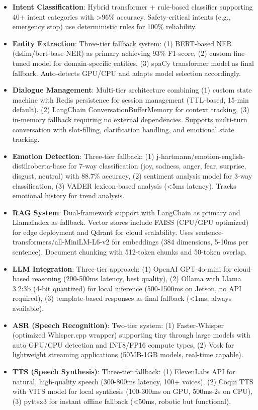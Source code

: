 \documentclass[conference]{IEEEtran}
\begin{document}
\begin{itemize}
    \item \textbf{Intent Classification}: Hybrid transformer + rule-based classifier supporting 40+ intent categories with >96\% accuracy. Safety-critical intents (e.g., emergency stop) use deterministic rules for 100\% reliability.
    
    \item \textbf{Entity Extraction}: Three-tier fallback system: (1) BERT-based NER (dslim/bert-base-NER) as primary achieving 93\% F1-score, (2) custom fine-tuned model for domain-specific entities, (3) spaCy transformer model as final fallback. Auto-detects GPU/CPU and adapts model selection accordingly.
    
    \item \textbf{Dialogue Management}: Multi-tier architecture combining (1) custom state machine with Redis persistence for session management (TTL-based, 15-min default), (2) LangChain ConversationBufferMemory for context tracking, (3) in-memory fallback requiring no external dependencies. Supports multi-turn conversation with slot-filling, clarification handling, and emotional state tracking.
    
    \item \textbf{Emotion Detection}: Three-tier fallback: (1) j-hartmann/emotion-english-distilroberta-base for 7-way classification (joy, sadness, anger, fear, surprise, disgust, neutral) with 88.7\% accuracy, (2) sentiment analysis model for 3-way classification, (3) VADER lexicon-based analysis (<5ms latency). Tracks emotional history for trend analysis.
    
    \item \textbf{RAG System}: Dual-framework support with LangChain as primary and LlamaIndex as fallback. Vector stores include FAISS (CPU/GPU optimized) for edge deployment and Qdrant for cloud scalability. Uses sentence-transformers/all-MiniLM-L6-v2 for embeddings (384 dimensions, 5-10ms per sentence). Document chunking with 512-token chunks and 50-token overlap.
    
    \item \textbf{LLM Integration}: Three-tier approach: (1) OpenAI GPT-4o-mini for cloud-based reasoning (200-500ms latency, best quality), (2) Ollama with Llama 3.2:3b (4-bit quantized) for local inference (500-1500ms on Jetson, no API required), (3) template-based responses as final fallback (<1ms, always available).
    
    \item \textbf{ASR (Speech Recognition)}: Two-tier system: (1) Faster-Whisper (optimized Whisper.cpp wrapper) supporting tiny through large models with auto GPU/CPU detection and INT8/FP16 compute types, (2) Vosk for lightweight streaming applications (50MB-1GB models, real-time capable).
    
    \item \textbf{TTS (Speech Synthesis)}: Three-tier fallback: (1) ElevenLabs API for natural, high-quality speech (300-800ms latency, 100+ voices), (2) Coqui TTS with VITS model for local synthesis (100-300ms on GPU, 500ms-2s on CPU), (3) pyttsx3 for instant offline fallback (<50ms, robotic but functional).
\end{itemize}
\end{document}
